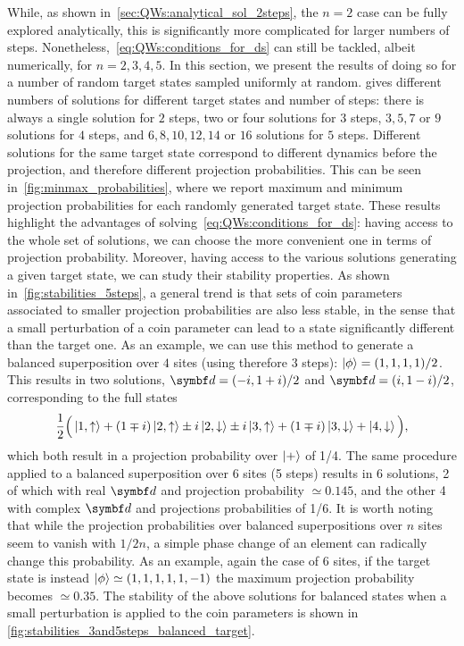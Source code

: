 While, as shown in~\cref{sec:QWs:analytical_sol_2steps}, the $n=2$ case can be fully explored analytically, this is significantly more complicated for larger numbers of steps. Nonetheless,~\cref{eq:QWs:conditions_for_ds} can still be tackled, albeit numerically, for $n=2,3,4,5$.
In this section, we present the results of doing so for a number of random target states sampled uniformly at random.
 gives different numbers of solutions for different target states and number of steps:
there is always a single solution for $2$ steps, two or four solutions for $3$ steps, $3, 5, 7$ or $9$ solutions for $4$ steps, and $6, 8, 10, 12, 14$ or $16$ solutions for $5$ steps.
Different solutions for the same target state correspond to different dynamics before the projection, and therefore different projection probabilities.
This can be seen in~\cref{fig:minmax_probabilities}, where we report maximum and minimum projection probabilities for each randomly generated target state.
These results highlight the advantages of solving~\cref{eq:QWs:conditions_for_ds}: having access to the whole set of solutions, we can choose the more convenient one in terms of projection probability.
Moreover, having access to the various solutions generating a given target state, we can study their stability properties.
As shown in~\cref{fig:stabilities_5steps}, a general trend is that sets of coin parameters associated to smaller projection probabilities are also less stable, in the sense that a small perturbation of a coin parameter can lead to a state significantly different than the target one.
As an example, we can use this method to generate a balanced superposition over $4$ sites (using therefore $3$ steps): $\ket\phi = (1, 1, 1, 1) / 2$.
This results in two solutions, $\bs d = (-i, 1+i)/2$ and $\bs d = (i, 1 - i)/2$,
corresponding to the full states
\begin{equation}
	\frac{1}{2}\Big(
		\ket{1,\uparrow} + 
		(1 \mp i) \ket{2,\uparrow} \pm i \ket{2, \downarrow}
		\pm i \ket{3, \uparrow} + (1 \mp i) \ket{3, \downarrow} +
		\ket{4, \downarrow}
	\Big),
\end{equation}
which both result in a projection probability over $\ket+$ of 1/4.
The same procedure applied to a balanced superposition over 6 sites (5 steps) results in 6 solutions, 2 of which with real $\bs d$ and projection probability $\simeq 0.145$, and the other 4 with complex $\bs d$ and projections probabilities of 1/6.
It is worth noting that while the projection probabilities over balanced superpositions over $n$ sites seem to vanish with $1/2n$, a simple phase change of an element can radically change this probability.
As an example, again the case of 6 sites, if the target state is instead $\ket\phi \simeq (1,1,1,1,1,-1)$ the maximum projection probability becomes $\simeq 0.35$.
The stability of the above solutions for balanced states when a small perturbation is applied to the coin parameters is shown in \cref{fig:stabilities_3and5steps_balanced_target}.


